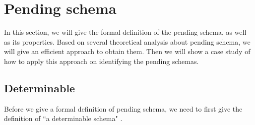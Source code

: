 %
%
%
%
%




\section{Pending schema}\label{sec:pending}
In this section, we will give the formal definition of the pending schema, as well as its properties. Based on several theoretical analysis about pending schema, we will give an efficient approach to obtain them. Then we will show a case study of  how to apply this approach on identifying the pending schemas.

\subsection{Determinable}
Before we give a formal definition of pending schema, we need to first give the  definition of ``a determinable schema" .

